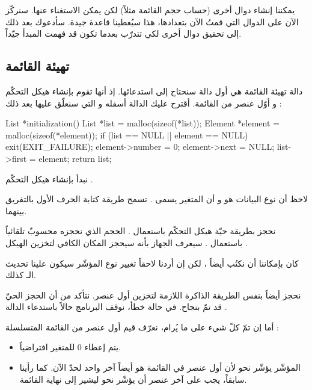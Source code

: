 يمكننا إنشاء دوال أخرى (حساب حجم القائمة مثلاً) لكن يمكن الاستغناء عنها. سنركّز الآن على الدوال التي قمتُ الآن بتعدادها، هذا سيُعطينا قاعدة جيدة. سأدعوك بعد ذلك إلى تحقيق دوال أخرى لكي تتدرّب بعدما تكون قد فهمت المبدأ جيّداً.

\subsection{تهيئة القائمة}

دالة تهيئة القائمة هي أول دالة سنحتاج إلى استدعائها. إذ أنها تقوم بإنشاء هيكل التحكّم و أوّل عنصر من القائمة. أقترح عليك الدالة أسفله و التي سنعلّق عليها بعد ذلك :

\begin{Csource}
List *initialization()
{
	List *list = malloc(sizeof(*list));
	Element *element = malloc(sizeof(*element));
	if (list == NULL || element == NULL)
	{
		exit(EXIT_FAILURE);
	}
	element->number = 0;
	element->next = NULL;
	list->first = element;
	return list;
}
\end{Csource}

نبدأ بإنشاء هيكل التحكّم 
.

\begin{information}
لاحظ أن نوع البيانات هو
و أن المتغير يسمى
.
تسمح طريقة كتابة الحرف الأول بالتفريق بينهما.
\end{information}

نحجز بطريقة حيّة هيكل التحكّم باستعمال 
.
الحجم الذي نحجزه محسوبٌ تلقائياً باستعمال
.
سيعرف الجهاز بأنه سيحجز المكان الكافي لتخزين الهيكل
.

\begin{information}
 كان بإمكاننا أن نكتُب أيضاً
،
لكن إن أردنا لاحقاً تغيير نوع المؤشّر
سيكون علينا تحديث الـ
كذلك.
\end{information}

نحجز أيضاً بنفس الطريقة الذاكرة اللازمة لتخزين أول عنصر. نتأكد من أن الحجز الحيّ قد تمّ بنجاح. في حالة خطأ، نوقف البرنامج حالاً باستدعاء الدالة
.

أما إن تمّ كلّ شيء على ما يُرام، نعرّف قيم أول عنصر من القائمة المتسلسلة :

\begin{itemize}
	\item يتم إعطاء $ 0 $ للمتغير
	افتراضياً.
	\item المؤشّر
	يؤشّر نحو
	لأن أول عنصر في القائمة هو أيضاً آخر واحد لحدّ الآن. كما رأينا سابقاً، يجب على آخر عنصر أن يؤشّر نحو
	ليشير إلى نهاية القائمة.
\end{itemize}

